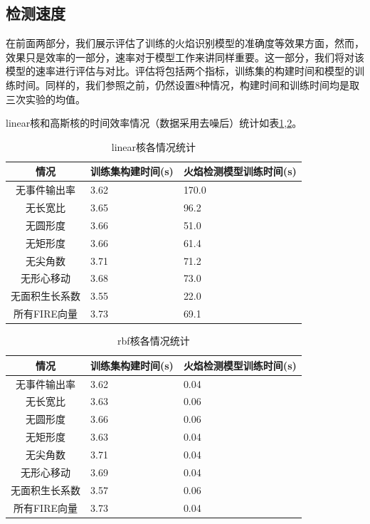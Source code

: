 \subsection{检测速度}
在前面两部分，我们展示评估了训练的火焰识别模型的准确度等效果方面，然而，效果只是效率的一部分，速率对于模型工作来讲同样重要。这一部分，我们将对该模型的速率进行评估与对比。评估将包括两个指标，训练集的构建时间和模型的训练时间。同样的，我们参照之前，仍然设置8种情况，构建时间和训练时间均是取三次实验的均值。

linear核和高斯核的时间效率情况（数据采用去噪后）统计如表\ref{t_linear},\ref{t_rbf}。
\begin{table}[ht]
    \centering
    \caption{linear核各情况统计}
    \begin{tabularx}{0.7\textwidth}{c|X|X}
        \toprule
        情况&训练集构建时间(s)&火焰检测模型训练时间(s)\\
        \midrule
        无事件输出率&3.62&170.0\\
        无长宽比&3.65&96.2\\
        无圆形度&3.66&51.0\\
        无矩形度&3.66&61.4\\
        无尖角数&3.71&71.2\\
        无形心移动&3.68&73.0\\
        无面积生长系数&3.55&22.0\\
        所有FIRE向量&3.73&69.1\\
        \bottomrule
    \end{tabularx}
    \label{t_linear}
\end{table}



\begin{table}[ht]
    \centering
    \caption{rbf核各情况统计}
    \begin{tabularx}{0.7\textwidth}{c|X|X}
        \toprule
        情况&训练集构建时间(s)&火焰检测模型训练时间(s)\\
        \midrule
        无事件输出率&3.62&0.04\\
        无长宽比&3.63&0.06\\
        无圆形度&3.66&0.06\\
        无矩形度&3.63&0.04\\
        无尖角数&3.71&0.04\\
        无形心移动&3.69&0.04\\
        无面积生长系数&3.57&0.06\\
        所有FIRE向量&3.73&0.04\\
        \bottomrule
    \end{tabularx}
    \label{t_rbf}
\end{table}

